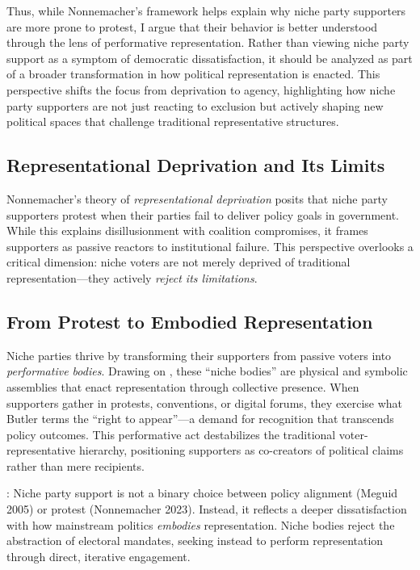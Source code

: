 Thus, while Nonnemacher’s framework helps explain why niche party supporters are more prone to protest, I argue that their behavior is better understood through the lens of performative representation. Rather than viewing niche party support as a symptom of democratic dissatisfaction, it should be analyzed as part of a broader transformation in how political representation is enacted. This perspective shifts the focus from deprivation to agency, highlighting how niche party supporters are not just reacting to exclusion but actively shaping new political spaces that challenge traditional representative structures.

\begin{greenenv}
	\subsection{Representational Deprivation and Its Limits}
	Nonnemacher’s \parencite*{nonnemacher2023} theory of \textit{representational deprivation} posits that niche party supporters protest when their parties fail to deliver policy goals in government. While this explains disillusionment with coalition compromises, it frames supporters as passive reactors to institutional failure. This perspective overlooks a critical dimension: niche voters are not merely deprived of traditional representation—they actively \textit{reject its limitations}.

	\subsection{From Protest to Embodied Representation}
	Niche parties thrive by transforming their supporters from passive voters into \textit{performative bodies}. Drawing on \cite{kim2024}, these “niche bodies” are physical and symbolic assemblies that enact representation through collective presence. When supporters gather in protests, conventions, or digital forums, they exercise what Butler terms the \enquote{right to appear}—a demand for recognition that transcends policy outcomes. This performative act destabilizes the traditional voter-representative hierarchy, positioning supporters as co-creators of political claims rather than mere recipients.

	: Niche party support is not a binary choice between policy alignment (Meguid 2005) or protest (Nonnemacher 2023). Instead, it reflects a deeper dissatisfaction with how mainstream politics \textit{embodies} representation. Niche bodies reject the abstraction of electoral mandates, seeking instead to perform representation through direct, iterative engagement.


\end{greenenv}
